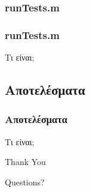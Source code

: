 \documentclass[xetex,serif,mathserif,14pt]{beamer}
\begin{document}
\subsubsection{runTests.m}
\begin{frame}
\frametitle{runTests.m}
Τι είναι;
\end{frame}

\subsection{Αποτελέσματα}
\begin{frame}
\frametitle{Αποτελέσματα}
Τι είναι;
\end{frame}



\begin{frame}

\Huge{\centerline{Thank You}}
\Large{\centerline{Questions?}}
\end{frame}
\end{document}
